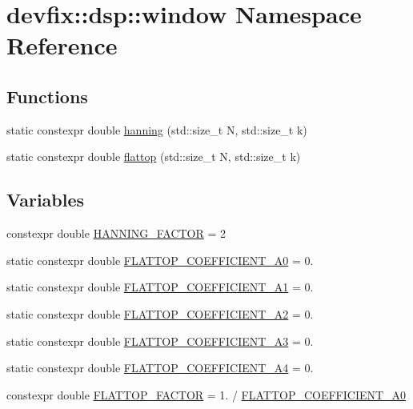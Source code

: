 \hypertarget{namespacedevfix_1_1dsp_1_1window}{}\section{devfix\+:\+:dsp\+:\+:window Namespace Reference}
\label{namespacedevfix_1_1dsp_1_1window}
\subsection*{Functions}
\begin{DoxyCompactItemize}
\item 
static constexpr double \hyperlink{namespacedevfix_1_1dsp_1_1window_a12fbb24522441fc514d5b91aa87700d9}{hanning} (std\+::size\+\_\+t N, std\+::size\+\_\+t k)
\item 
static constexpr double \hyperlink{namespacedevfix_1_1dsp_1_1window_a66e83642c52d214a8e93c55b44f301b7}{flattop} (std\+::size\+\_\+t N, std\+::size\+\_\+t k)
\end{DoxyCompactItemize}
\subsection*{Variables}
\begin{DoxyCompactItemize}
\item 
constexpr double \hyperlink{namespacedevfix_1_1dsp_1_1window_afefd5e205b1e680a11d151636bd8d7d6}{H\+A\+N\+N\+I\+N\+G\+\_\+\+F\+A\+C\+T\+OR} = 2
\item 
static constexpr double \hyperlink{namespacedevfix_1_1dsp_1_1window_a56cc9b2072418de1930eca41a7adcc46}{F\+L\+A\+T\+T\+O\+P\+\_\+\+C\+O\+E\+F\+F\+I\+C\+I\+E\+N\+T\+\_\+\+A0} = 0.
\item 
static constexpr double \hyperlink{namespacedevfix_1_1dsp_1_1window_a05f4dbfec113d07e6a71c700b8bb217f}{F\+L\+A\+T\+T\+O\+P\+\_\+\+C\+O\+E\+F\+F\+I\+C\+I\+E\+N\+T\+\_\+\+A1} = 0.
\item 
static constexpr double \hyperlink{namespacedevfix_1_1dsp_1_1window_a9bda087deef64072ca63626def1f6252}{F\+L\+A\+T\+T\+O\+P\+\_\+\+C\+O\+E\+F\+F\+I\+C\+I\+E\+N\+T\+\_\+\+A2} = 0.
\item 
static constexpr double \hyperlink{namespacedevfix_1_1dsp_1_1window_af994e2f42adaa6623ebc857529548e8e}{F\+L\+A\+T\+T\+O\+P\+\_\+\+C\+O\+E\+F\+F\+I\+C\+I\+E\+N\+T\+\_\+\+A3} = 0.
\item 
static constexpr double \hyperlink{namespacedevfix_1_1dsp_1_1window_a423b29e0a8ae1878f7faa0108f003066}{F\+L\+A\+T\+T\+O\+P\+\_\+\+C\+O\+E\+F\+F\+I\+C\+I\+E\+N\+T\+\_\+\+A4} = 0.
\item 
constexpr double \hyperlink{namespacedevfix_1_1dsp_1_1window_a53b54760eb4f662aa7a64e33ec7f2d5e}{F\+L\+A\+T\+T\+O\+P\+\_\+\+F\+A\+C\+T\+OR} = 1. / \hyperlink{namespacedevfix_1_1dsp_1_1window_a56cc9b2072418de1930eca41a7adcc46}{F\+L\+A\+T\+T\+O\+P\+\_\+\+C\+O\+E\+F\+F\+I\+C\+I\+E\+N\+T\+\_\+\+A0}
\end{DoxyCompactItemize}


